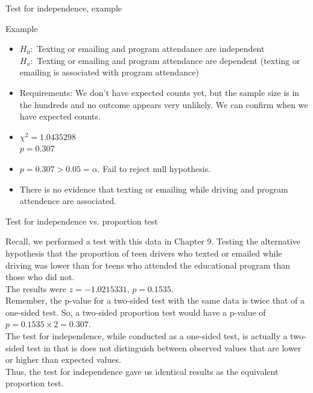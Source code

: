 \documentclass[xcolor=table]{beamer}
\begin{document}
\begin{frame}{Test for independence, example}
\begin{exampleblock}{Example}
\begin{itemize}
\pause\item $H_0:$ Texting or emailing and program attendance are independent\\
$H_a:$ Texting or emailing and program attendance are dependent (texting or emailing is associated with program attendance)
\pause\item Requirements: We don't have expected counts yet, but the sample size is in the hundreds and no outcome appears very unlikely. We can confirm when we have expected counts.
\pause\item $\chi^2 = 1.0435298$\\
$p = 0.307 $
\pause\item $p = 0.307 > 0.05 = \alpha$. Fail to reject null hypothesis.
\pause\item There is no evidence that texting or emailing while driving and program attendence are associated.
\end{itemize}
\end{exampleblock}
\end{frame}

\begin{frame}{Test for independence vs. proportion test}
\begin{block}{}
Recall, we performed a test with this data in Chapter 9. Testing the alternative hypothesis that the proportion of teen drivers who texted or emailed while driving was lower than for teens who attended the educational program than those who did not. \\
\pause\medskip 
The results were $z = -1.0215331, \, p = 0.1535$.\\
\pause\medskip
Remember, the p-value for a two-sided test with the same data is twice that of a one-sided test. So, a two-sided proportion test would have a p-value of $p = 0.1535 \times 2 = 0.307$.\\
\pause\medskip
The test for independence, while conducted as a one-sided test, is actually a two-sided test in that is does not distinguish between observed values that are lower or higher than expected values.\\
\pause\medskip
Thus, the test for independence gave us identical results as the equivalent proportion test.
\end{block}
\end{frame}
\end{document}
